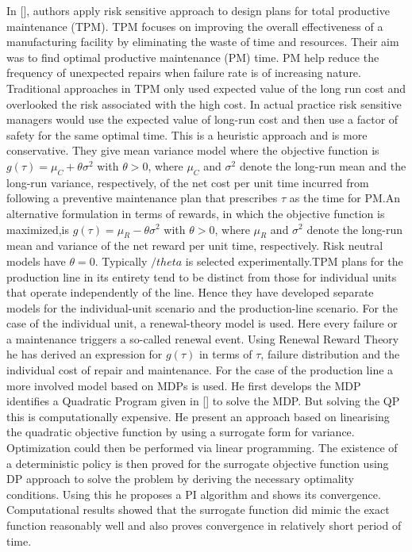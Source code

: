 \documentclass[10pt,a4paper,oneside]{report}
\begin{document}
In [], authors apply risk sensitive approach to design plans for total productive maintenance (TPM). TPM  focuses on improving the overall effectiveness of a manufacturing facility by eliminating the waste of time and resources. Their aim was to find optimal productive maintenance (PM) time. PM help reduce the frequency of unexpected repairs when failure rate is of increasing nature. Traditional approaches in TPM only used expected value of the long run cost and overlooked the risk associated with the high cost. In actual practice risk sensitive managers would use the expected value of long-run cost and then use a factor of safety for the same optimal time. This is a heuristic approach and is more conservative. They give mean variance model where the objective function is $g(\tau)= \mu_C+ \theta {\sigma}^2$ with $\theta>0$, where $\mu_C$ and $\sigma^2$ denote the long-run mean and the long-run variance, respectively, of the net cost per unit time incurred from following a preventive maintenance plan that prescribes $\tau$ as the time for PM.An alternative formulation in terms of rewards, in which the objective function is maximized,is $g(\tau)= \mu_R- \theta {\sigma}^2$ with $\theta>0$, where $\mu_R$ and $\sigma^2$ denote the long-run mean and variance of the net reward per unit time, respectively. Risk neutral models have $\theta =0$. Typically $/theta$ is selected experimentally.TPM plans for the production line in its entirety tend to be
distinct from those for individual units that operate independently of the line. Hence they have developed separate models for the individual-unit scenario and the production-line scenario. For the case of the individual unit, a renewal-theory model is used. Here every failure or a maintenance triggers a so-called renewal event. Using Renewal Reward Theory he has derived an expression for $g(\tau)$ in terms of $\tau$, failure distribution and the individual cost of repair and maintenance. For the case of the production line a more involved model based on MDPs is used. He first develops the MDP identifies a Quadratic Program given in [] to solve the MDP. But solving the QP this is computationally expensive. He present an approach based on linearising the quadratic objective function by using a surrogate form for variance. Optimization could then be performed via linear programming. The existence of a deterministic policy is then proved for the surrogate objective function using DP approach to solve the problem by deriving the necessary optimality conditions. Using this he proposes a PI algorithm and shows its convergence. Computational results showed that the surrogate function did mimic the exact function reasonably well and also proves convergence in relatively short period of time.\\
\end{document}
